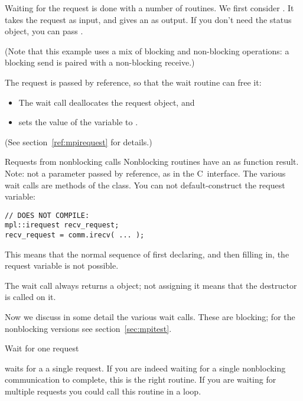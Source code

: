Waiting for the request is done with a number of routines. We first
consider . It takes the request as input, and
gives an  as output. If you don't need the
status object, you can pass .


(Note that this example uses a mix of blocking and non-blocking
operations: a blocking send is paired with a non-blocking receive.)

The request is passed by reference, so that the wait routine
can free it:
\begin{itemize}
\item The wait call deallocates the request object, and
\item sets the value of the variable to .
\end{itemize}
(See section~\ref{ref:mpirequest} for details.)

\begin{mplnote}{Requests from nonblocking calls}
  \label{mpl:irequest}
  Nonblocking routines have an  as function result.
  Note: not a parameter passed by reference, as in the C~interface.
  The various wait calls are methods of the 
  class.
  You can not default-construct the request variable:
\begin{lstlisting}
// DOES NOT COMPILE:
mpl::irequest recv_request;
recv_request = comm.irecv( ... );
\end{lstlisting}
This means that the normal sequence of first declaring, and then filling in,
the request variable is not possible.

\begin{mplimpl}
  The wait call always returns a  object;
  not assigning it means that the destructor is called on it.
\end{mplimpl}
\end{mplnote}

Now we discuss in some detail the various wait calls.
These are blocking; for the nonblocking versions
see section~\ref{sec:mpitest}.

 {Wait for one request}

 waits for a a single request. If you are
indeed waiting for a single nonblocking communication to complete,
this is the right routine. If you are waiting for multiple requests
you could call this routine in a loop.

